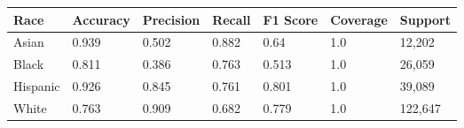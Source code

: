 \begin{tabular}{lllllll}
\toprule
Race & Accuracy & Precision & Recall & F1 Score & Coverage & Support \\
\midrule
Asian & 0.939 & 0.502 & 0.882 & 0.64 & 1.0 & 12,202 \\
Black & 0.811 & 0.386 & 0.763 & 0.513 & 1.0 & 26,059 \\
Hispanic & 0.926 & 0.845 & 0.761 & 0.801 & 1.0 & 39,089 \\
White & 0.763 & 0.909 & 0.682 & 0.779 & 1.0 & 122,647 \\
\bottomrule
\end{tabular}
